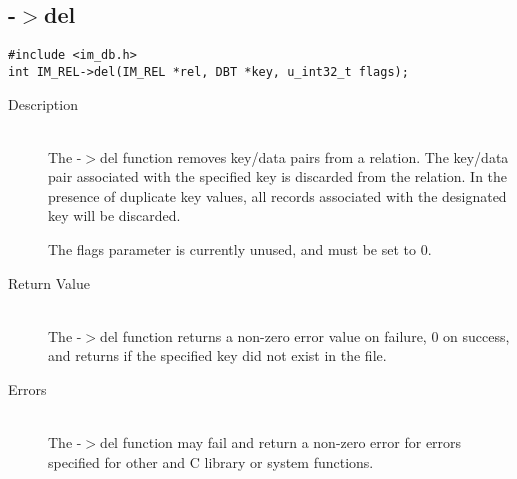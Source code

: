 \newpage
\subsection{{\IMREL}-$>$del}
\begin{verbatim}
#include <im_db.h>
int IM_REL->del(IM_REL *rel, DBT *key, u_int32_t flags);
\end{verbatim}
\begin{description}
\item[Description]\ \\
  The {\IMREL}-$>$del function removes key/data pairs from a
  relation. The key/data pair associated with the specified key is
  discarded from the relation. In the presence of duplicate key
  values, all records associated with the designated key will be
  discarded.

  The flags parameter is currently unused, and must be set to 0.
\item[Return Value]\ \\
  The {\IMREL}-$>$del function returns a non-zero error value on
  failure, 0 on success, and returns {\DBNOTFOUND} if the specified key
  did not exist in the file.
\item[Errors]\ \\
The {\IMREL}-$>$del function may fail and return a non-zero error for
errors specified for other {\IMDB} and C library or system functions.
\end{description}

\newpage
